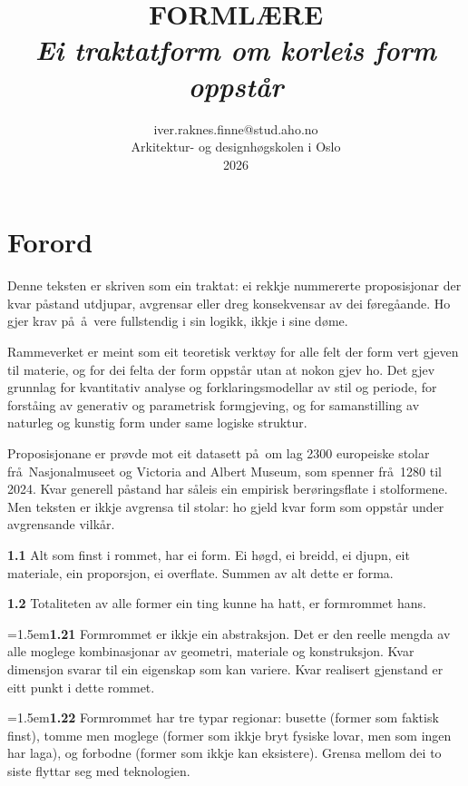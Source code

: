 \documentclass[11pt, a4paper]{article}
\title{%
  \vspace{-1cm}
  {\huge\textbf{FORML\AE RE}}\\[0.5em]
  {\large\textit{Ei traktatform om korleis form oppst\aa r}}
}
\author{
  iver.raknes.finne@stud.aho.no\\
  Arkitektur- og designh\o gskolen i Oslo\\
  2026
}
\date{}
\newcommand{\prop}[1]{\bigskip\noindent{\Large\textbf{#1}}\medskip\par}
\newcommand{\subprop}[1]{\medskip\noindent\textbf{#1}\quad}
\newcommand{\subsubprop}[1]{\smallskip\hangindent=1.5em\noindent\hspace{1.5em}\textbf{#1}\quad}
\begin{document}
\maketitle
\thispagestyle{empty}

\section*{Forord}

Denne teksten er skriven som ein traktat: ei rekkje nummererte proposisjonar der kvar p\aa stand utdjupar, avgrensar eller dreg konsekvensar av dei f\o reg\aa ande. Ho gjer krav p\aa\ \aa\ vere fullstendig i sin logikk, ikkje i sine d\o me.

Rammeverket er meint som eit teoretisk verkt\o y for alle felt der form vert gjeven til materie, og for dei felta der form oppst\aa r utan at nokon gjev ho. Det gjev grunnlag for kvantitativ analyse og forklaringsmodellar av stil og periode, for forst\aa ing av generativ og parametrisk formgjeving, og for samanstilling av naturleg og kunstig form under same logiske struktur.

Proposisjonane er pr\o vde mot eit datasett p\aa\ om lag 2300 europeiske stolar fr\aa\ Nasjonalmuseet og Victoria and Albert Museum, som spenner fr\aa\ 1280 til 2024. Kvar generell p\aa stand har s\aa leis ein empirisk ber\o ringsflate i stolformene. Men teksten er ikkje avgrensa til stolar: ho gjeld kvar form som oppst\aa r under avgrensande vilk\aa r.

\newpage
\tableofcontents
\newpage

\prop{1 Ting har former.}

\subprop{1.1} Alt som finst i rommet, har ei form. Ei h\o gd, ei breidd, ei djupn, eit materiale, ein proporsjon, ei overflate. Summen av alt dette er forma.

\subprop{1.2} Totaliteten av alle former ein ting kunne ha hatt, er formrommet hans.

\subsubprop{1.21} Formrommet er ikkje ein abstraksjon. Det er den reelle mengda av alle moglege kombinasjonar av geometri, materiale og konstruksjon. Kvar dimensjon svarar til ein eigenskap som kan variere. Kvar realisert gjenstand er eitt punkt i dette rommet.

\subsubprop{1.22} Formrommet har tre typar regionar: busette (former som faktisk finst), tomme men moglege (former som ikkje bryt fysiske lovar, men som ingen har laga), og forbodne (former som ikkje kan eksistere). Grensa mellom dei to siste flyttar seg med teknologien.
\end{document}
